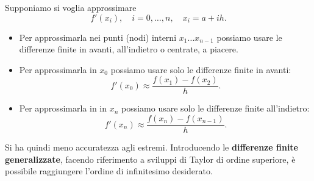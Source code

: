 Supponiamo si voglia approssimare
\begin{equation*}
f'( x_{i}) ,\quad i=0,\dotsc ,n,\quad x_{i} =a+ih.
\end{equation*}
\begin{itemize}
\item Per approssimarla nei punti (nodi) interni $x_{1} \dotsc x_{n-1}$ possiamo usare le differenze finite in avanti, all'indietro o centrate, a piacere.
\item Per approssimarla in $x_{0}$ possiamo usare solo le differenze finite in avanti:
\begin{equation*}
f'( x_{0}) \approx \frac{f( x_{1}) -f( x_{2})}{h}.
\end{equation*}
\item Per approssimarla in in $x_{n}$ possiamo usare solo le differenze finite all'indietro:
\begin{equation*}
f'( x_{n}) \approx \frac{f( x_{n}) -f( x_{n-1})}{h}.
\end{equation*}
\end{itemize}

Si ha quindi meno accuratezza agli estremi.
Introducendo le \textbf{differenze finite generalizzate}, facendo riferimento a sviluppi di Taylor di ordine superiore, è possibile raggiungere l'ordine di infinitesimo desiderato.

